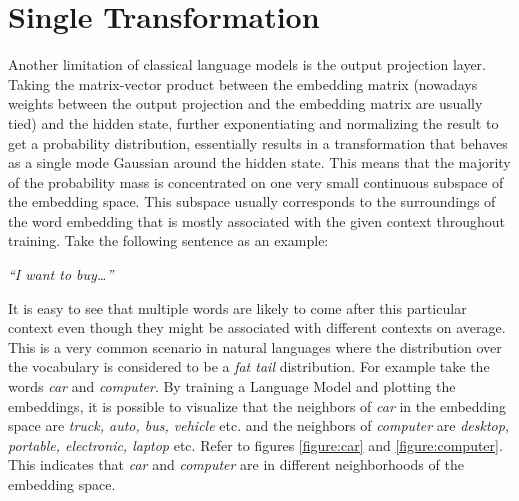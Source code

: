 \section{Single Transformation}
\label{section:limitations:single_transformation}

Another limitation of classical language models is the output projection layer. Taking the matrix-vector product between the embedding matrix (nowadays weights between the output projection and the embedding matrix are usually tied) and the hidden state, further exponentiating and normalizing the result to get a probability distribution, essentially results in a transformation that behaves as a single mode Gaussian around the hidden state. This means that the majority of the probability mass is concentrated on one very small continuous subspace of the embedding space. This subspace usually corresponds to the surroundings of the word embedding that is mostly associated with the given context throughout training. Take the following sentence as an example:

\begin{center}
    \emph{“I want to buy…”}
\end{center}

It is easy to see that multiple words are likely to come after this particular context even though they might be associated with different contexts on average. This is a very common scenario in natural languages where the distribution over the vocabulary is considered to be a \emph{fat tail} distribution. For example take the words \emph{car} and \emph{computer}. By training a Language Model and plotting the embeddings, it is possible to visualize that the neighbors of \emph{car} in the embedding space are \emph{truck, auto, bus, vehicle} etc. and the neighbors of \emph{computer} are \emph{desktop, portable, electronic, laptop} etc. Refer to figures \ref{figure:car} and \ref{figure:computer}. This indicates that \emph{car} and \emph{computer} are in different neighborhoods of the embedding space.

